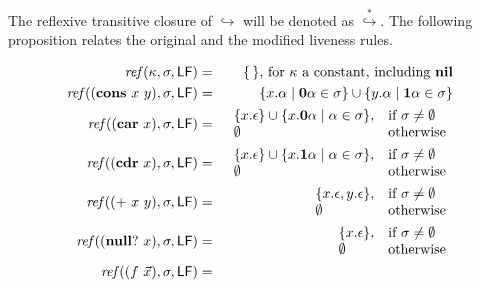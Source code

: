 \documentclass[9pt]{sigplanconf}
\def\myvec{\mathaccent"017E } %
\begin{document}
The reflexive  transitive closure of  $\hookrightarrow$ will
be   denoted    as   $\stackrel{*}{\hookrightarrow}$.    The
following proposition relates  the original and the modified
liveness rules.

\begin{figure*}[t]
\begin{eqnarray*}
\mathit{ref\/}(\kappa,\sigma,\Lfonly)
          &=& \{\,\} \mbox{, for $\kappa$ a constant, including
$\NIL$}\\
\mathit{ref\/}((\CONS~x~y),\sigma,\Lfonly)
          &=& \{x.\alpha \mid \acar\alpha \in \sigma\} \cup \{y.\alpha
\mid \acdr\alpha \in \sigma\} \\
\mathit{ref\/}((\CAR~x),\sigma,\Lfonly)
          &=&    \begin{array}{l l}
                    \{x.\epsilon\} \cup \{x.\acar\alpha \mid \alpha \in
\sigma\}, & \mbox{if}~\sigma \ne \emptyset\\
                    \emptyset  & \mbox{otherwise}
                 \end{array} \\
\mathit{ref\/}((\CDR~x),\sigma,\Lfonly)
          &=&    \begin{array}{l l}
                    \{x.\epsilon\} \cup \{x.\acdr\alpha \mid \alpha \in
\sigma\}, & \mbox{if}~\sigma \ne \emptyset\\
                    \emptyset  & \mbox{otherwise}
                 \end{array} \\
\mathit{ref\/}((\PRIM~x~y),\sigma,\Lfonly)
          &=&    \begin{array}{l l}
                    \{x.\epsilon, y.\epsilon\},  & \mbox{if}~\sigma \ne
\emptyset\\
                    \emptyset  & \mbox{otherwise}
                 \end{array} \\
\mathit{ref\/}((\NULLQ~x),\sigma,\Lfonly)
          &=&    \begin{array}{l l}
                    \{x.\epsilon\},  & \mbox{if}~\sigma \ne \emptyset\\
                    \emptyset  & \mbox{otherwise}
                 \end{array} \\
\mathit{ref\/}((f~\myvec{x}),\sigma,\Lfonly)
          &=&  \begin{array}{@{}l}  %

\end{array}
\end{eqnarray*}
\end{figure*}
\end{document}
